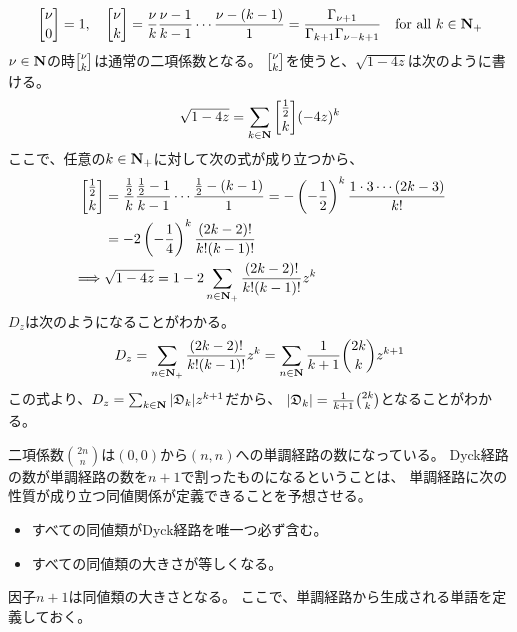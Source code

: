{	\begin{equation*}\begin{split}
		\cbinom{\nu}{0} = 1,\quad
		\cbinom{\nu}{k} = \frac{\nu}{k}\frac{\nu-1}{k-1}
			\cdots\frac{\nu-(k-1)}{1}
		= \frac{\Gamma_{\nu+1}}{\Gamma_{k+1}\Gamma_{\nu-k+1}}
		\quad\text{for all } k\in\sizen_+
	\end{split}\end{equation*}
	$\nu\in\mathbf{N}$の時$\cbinom{\nu}{k}$は通常の二項係数となる。
	$\cbinom{\nu}{k}$を使うと、$\sqrt{1-4z}$は次のように書ける。
	\begin{equation*}\begin{split}
		\sqrt{1-4z} = \sum_{k\in\sizen} \cbinom{\frac{1}{2}}{k} (-4z)^k
	\end{split}\end{equation*}
	ここで、任意の$k\in\mathbf{N}_+$に対して次の式が成り立つから、
	\begin{equation*}\begin{split}
		\cbinom{\frac{1}{2}}{k}
		&= \frac{\frac{1}{2}}{k}\frac{\frac{1}{2}-1}{k-1}
			\cdots\frac{\frac{1}{2}-(k-1)}{1}
		= -\left(-\frac{1}{2}\right)^k\frac{1\cdot3\cdots(2k-3)}{k!} \\
		&= -2\left(-\frac{1}{4}\right)^k \frac{(2k-2)!}{k!(k-1)!} \\
		\implies & \sqrt{1-4z} = 1 - 2\sum_{n\in\sizen_+}
			\frac{(2k-2)!}{k!(k-1)!} z^k \\
	\end{split}\end{equation*}
	$D_z$は次のようになることがわかる。
	\begin{equation*}\begin{split}
		D_z = \sum_{n\in\mathbf{N}_+} \frac{(2k-2)!}{k!(k-1)!} z^k
		= \sum_{n\in\mathbf{N}} \frac{1}{k+1} \binom{2k}{k} z^{k+1}
	\end{split}\end{equation*}
	この式より、$D_z=\sum_{k\in\mathbf{N}}|{\mathfrak D}_k|z^{k+1}$だから、
	$|{\mathfrak D}_k|=\frac{1}{k+1} \binom{2k}{k}$となることがわかる。

	二項係数$\binom{2n}{n}$は$(0,0)$から$(n,n)$への単調経路の数になっている。
	Dyck経路の数が単調経路の数を$n+1$で割ったものになるということは、
	単調経路に次の性質が成り立つ同値関係が定義できることを予想させる。
	\begin{itemize}\setlength{\itemsep}{-1mm} %
		\item すべての同値類がDyck経路を唯一つ必ず含む。
		\item すべての同値類の大きさが等しくなる。
	\end{itemize} %
	因子$n+1$は同値類の大きさとなる。
	ここで、単調経路から生成される単語を定義しておく。

}
